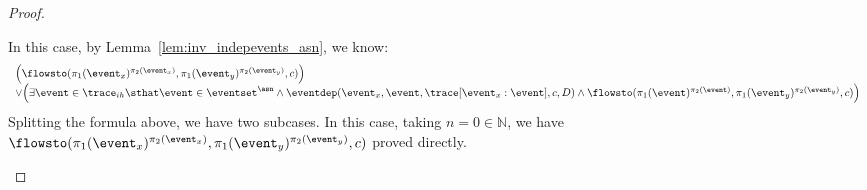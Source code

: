 \begin{proof}
\begin{case}
        In this case, by Lemma~\ref{lem:inv_indepevents_asn}, we know:
        \[
          \begin{array}{l}
            \Big( 
              \flowsto(\pi_1(\event_x)^{\pi_2(\event_x)}, \pi_1(\event_y)^{\pi_2(\event_y)}, c) 
              \Big)
        \\ \lor
        \Big( 
          \exists \event \in \trace_{ih} \sthat  
          \event \in \eventset^{\asn}
          \land
          \eventdep(\event_x, \event, \trace[\event_x:\event], c, D)
          \land 
        \flowsto(\pi_1(\event)^{\pi_2(\event)}, \pi_1(\event_y)^{\pi_2(\event_y)}, c) 
        \Big)
      \end{array}
      \]
        Splitting the formula above, we have two subcases.
        In this case, taking $n = 0 \in \mathbb{N}$, 
        we have $\flowsto(\pi_1(\event_x)^{\pi_2(\event_x)}, \pi_1(\event_y)^{\pi_2(\event_y)}, c) $ proved directly.
        

\end{case}
\end{proof}
